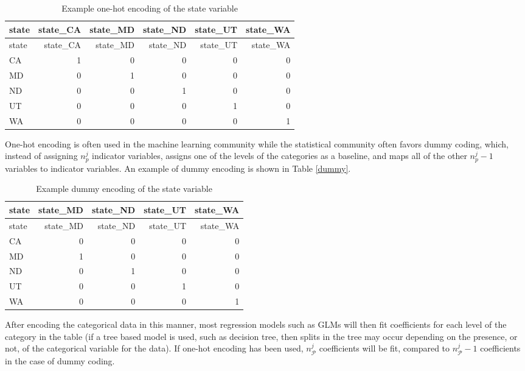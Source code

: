 \documentclass{article}
\begin{document}
\begin{longtable}[]{@{}lrrrrr@{}}
\caption{Example one-hot encoding of the state variable}\tabularnewline
\toprule
state & state\_CA & state\_MD & state\_ND & state\_UT &
state\_WA\tabularnewline
\midrule
\endfirsthead
\toprule
state & state\_CA & state\_MD & state\_ND & state\_UT &
state\_WA\tabularnewline
\midrule
\endhead
CA & 1 & 0 & 0 & 0 & 0\tabularnewline
MD & 0 & 1 & 0 & 0 & 0\tabularnewline
ND & 0 & 0 & 1 & 0 & 0\tabularnewline
UT & 0 & 0 & 0 & 1 & 0\tabularnewline
WA & 0 & 0 & 0 & 0 & 1\tabularnewline
\bottomrule
\end{longtable}

One-hot encoding is often used in the machine learning community while
the statistical community often favors dummy coding, which, instead of
assigning \(n_p^j\) indicator variables, assigns one of the levels of
the categories as a baseline, and maps all of the other \(n_p^j -1\)
variables to indicator variables. An example of dummy encoding is shown
in Table \ref{dummy}.

\begin{longtable}[]{@{}lrrrr@{}}
\caption{Example dummy encoding of the state variable}\tabularnewline
\toprule
state & state\_MD & state\_ND & state\_UT & state\_WA\tabularnewline
\midrule
\endfirsthead
\toprule
state & state\_MD & state\_ND & state\_UT & state\_WA\tabularnewline
\midrule
\endhead
CA & 0 & 0 & 0 & 0\tabularnewline
MD & 1 & 0 & 0 & 0\tabularnewline
ND & 0 & 1 & 0 & 0\tabularnewline
UT & 0 & 0 & 1 & 0\tabularnewline
WA & 0 & 0 & 0 & 1\tabularnewline
\bottomrule
\end{longtable}

After encoding the categorical data in this manner, most regression
models such as GLMs will then fit coefficients for each level of the
category in the table (if a tree based model is used, such as decision
tree, then splits in the tree may occur depending on the presence, or
not, of the categorical variable for the data). If one-hot encoding has
been used, \(n_\mathcal{P}^j\) coefficients will be fit, compared to
\(n_\mathcal{P}^j - 1\) coefficients in the case of dummy coding.
\end{document}

